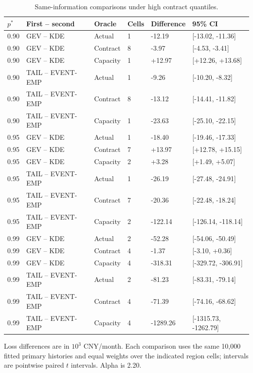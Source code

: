 \begingroup
\fontsize{8.5}{10.5}\selectfont\setlength{\tabcolsep}{3.0pt}\renewcommand{\arraystretch}{1.23}
\begin{table}[tbp]\centering
\caption{Same-information comparisons under high contract quantiles.}\label{tab:si-high-pstar}
\begin{tabular}{@{}llllll@{}}\toprule
$p^*$ & First -- second & Oracle & Cells & Difference & 95\% CI\\\midrule
0.90 & GEV -- KDE & Actual & 1 & -12.19 & [-13.02, -11.36]\\
0.90 & GEV -- KDE & Contract & 8 & -3.97 & [-4.53, -3.41]\\
0.90 & GEV -- KDE & Capacity & 1 & +12.97 & [+12.26, +13.68]\\
0.90 & TAIL -- EVENT-EMP & Actual & 1 & -9.26 & [-10.20, -8.32]\\
0.90 & TAIL -- EVENT-EMP & Contract & 8 & -13.12 & [-14.41, -11.82]\\
0.90 & TAIL -- EVENT-EMP & Capacity & 1 & -23.63 & [-25.10, -22.15]\\
0.95 & GEV -- KDE & Actual & 1 & -18.40 & [-19.46, -17.33]\\
0.95 & GEV -- KDE & Contract & 7 & +13.97 & [+12.78, +15.15]\\
0.95 & GEV -- KDE & Capacity & 2 & +3.28 & [+1.49, +5.07]\\
0.95 & TAIL -- EVENT-EMP & Actual & 1 & -26.19 & [-27.48, -24.91]\\
0.95 & TAIL -- EVENT-EMP & Contract & 7 & -20.36 & [-22.48, -18.24]\\
0.95 & TAIL -- EVENT-EMP & Capacity & 2 & -122.14 & [-126.14, -118.14]\\
0.99 & GEV -- KDE & Actual & 2 & -52.28 & [-54.06, -50.49]\\
0.99 & GEV -- KDE & Contract & 4 & -1.37 & [-3.10, +0.36]\\
0.99 & GEV -- KDE & Capacity & 4 & -318.31 & [-329.72, -306.91]\\
0.99 & TAIL -- EVENT-EMP & Actual & 2 & -81.23 & [-83.31, -79.14]\\
0.99 & TAIL -- EVENT-EMP & Contract & 4 & -71.39 & [-74.16, -68.62]\\
0.99 & TAIL -- EVENT-EMP & Capacity & 4 & -1289.26 & [-1315.73, -1262.79]\\
\bottomrule
\end{tabular}
\par\smallskip\noindent\begin{minipage}{\linewidth}\footnotesize Loss differences are in $10^3$ CNY/month. Each comparison uses the same 10,000 fitted primary histories and equal weights over the indicated region cells; intervals are pointwise paired $t$ intervals. Alpha is 2.20.\end{minipage}
\end{table}
\endgroup
